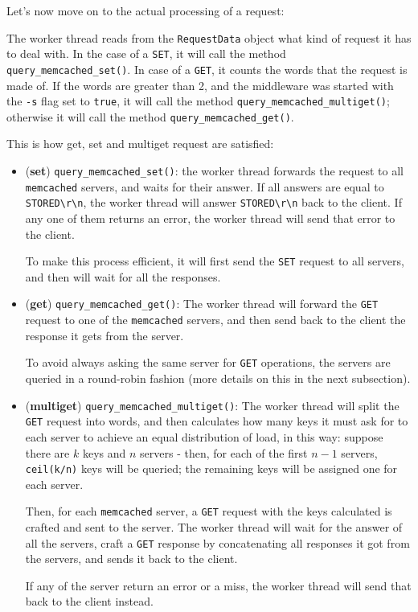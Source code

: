 \documentclass[11pt,a4paper]{article}
\renewcommand{\t}[1]{%
	{\texttt{#1}}}
\begin{document}
Let's now move on to the actual processing of a request:

The worker thread reads from the \t{RequestData} object what kind of request it has to deal with.
In the case of a \t{SET}, it will call the method \t{query\_memcached\_set()}. In case of a \t{GET}, 
it counts the words that the request is made of. If the words are greater than 2, and the middleware
was started with the \t{-s} flag set to \t{true}, it will call the method \t{query\_memcached\_multiget()};
otherwise it will call the method \t{query\_memcached\_get()}.

This is how get, set and multiget request are satisfied:

\begin{itemize}
	\item (\textbf{set}) \t{query\_memcached\_set()}: the worker thread forwards the request to all \t{memcached} servers, and
		waits for their answer. If all answers are equal to \verb|STORED\r\n|, the worker thread will answer
		\verb|STORED\r\n| back to the client. If any one of them returns an error, the worker thread will send
		that error to the client.

		To make this process efficient, it will first send the \t{SET} request
		to all servers, and then will wait for all the responses.
	\item (\textbf{get}) \t{query\_memcached\_get()}: The worker thread will forward the \t{GET} request to one of the \t{memcached} servers,
		and then send back to the client the response it gets from the server.

		To avoid always asking the same server for \t{GET} operations, the servers are queried in a round-robin fashion (more details on this in the next subsection).

	\item (\textbf{multiget}) \t{query\_memcached\_multiget()}: The worker thread will split the \t{GET} request into words, and then calculates
		how many keys it must ask for to each server to achieve an equal distribution of load, in this way:
		suppose there are $k$ keys and $n$ servers - then, for each of the first $n-1$ servers, \t{ceil(k/n)} keys will be queried; the remaining keys will be assigned one for each server.

		Then, for each \t{memcached} server, a \t{GET} request with the keys calculated is crafted and sent to the server.
		The worker thread will wait for the answer of all the servers, craft a \t{GET} response by concatenating
		all responses it got from the servers, and sends it back to the client.

		If any of the server return an error or a miss, the worker thread will send that back to the client instead.
\end{itemize}
\end{document}
